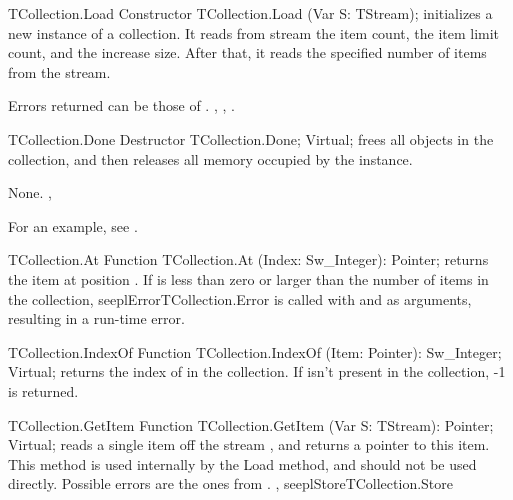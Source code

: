 \begin{procedure}{TCollection.Load}
\Declaration
Constructor TCollection.Load (Var S: TStream);
\Description
{} initializes a new instance of a collection. It reads from stream
 the item count, the item limit count, and the increase size. After
that, it reads the specified number of items from the stream. 

\Errors
Errors returned can be those of .
\SeeAlso
{}, ,
.
\end{procedure}



\begin{procedure}{TCollection.Done}
\Declaration
Destructor TCollection.Done; Virtual;
\Description
{} frees all objects in the collection, and then releases all memory
occupied by the instance.

\Errors
None.
\SeeAlso
{}, 
\end{procedure}

For an example, see .

\begin{function}{TCollection.At}
\Declaration
Function TCollection.At (Index: Sw\_Integer): Pointer;
\Description
{} returns the item at position .
\Errors
If  is less than zero or larger than the number of items
in the collection, seepl{Error}{TCollection.Error} is called with
 and  as arguments, resulting in a run-time
error.
\SeeAlso
{}
\end{function}



\begin{function}{TCollection.IndexOf}
\Declaration
Function TCollection.IndexOf (Item: Pointer): Sw\_Integer; Virtual;
\Description
{} returns the index of  in the collection. 
If  isn't present in the collection, -1 is returned.
\Errors
\SeeAlso
\end{function}



\begin{function}{TCollection.GetItem}
\Declaration
Function TCollection.GetItem (Var S: TStream): Pointer; Virtual;
\Description
{} reads a single item off the stream , and
returns a pointer to this item. This method is used internally by the Load
method, and should not be used directly.
\Errors
Possible errors are the ones from .
\SeeAlso
{}, seepl{Store}{TCollection.Store}
\end{function}

